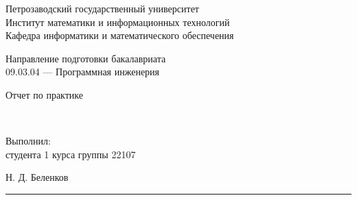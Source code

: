 \documentclass[a4paper,12pt]{article}
\newcommand{\myrule}[1]{\rule{#1}{0.4pt}}
\newcommand{\sign}[2][~]{{\small\myrule{#2}\\[-0.7em]\makebox[#2]{\it #1}}}
\renewcommand{\baselinestretch}{1.50}
\begin{document}

\thispagestyle{empty}
\begin{center}


\renewcommand{\baselinestretch}{1}
{\large
{\sc Петрозаводский государственный университет\\
Институт математики и информационных технологий\\
Кафедра информатики и математического обеспечения
}
}

\end{center}


\begin{center}
%
%
 Направление подготовки бакалавриата \\
09.03.04 --- Программная инженерия \\
\end{center}

\vfill

\begin{center}
{\normalsize 
	Отчет по практике}

\medskip

	{\Large {}} \\
\end{center}

\medskip

\begin{flushright}
\parbox{11cm}{%
\renewcommand{\baselinestretch}{1.2}
\normalsize
	Выполнил:\\
студента 1 курса группы 22107
\begin{flushright}
	Н. Д. Беленков \sign[подпись]{4cm}
\end{flushright}


}
\end{flushright}
\end{document}
